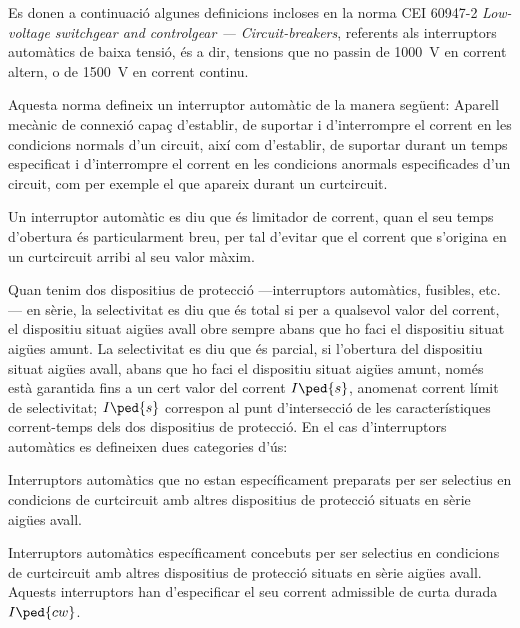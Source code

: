 Es donen a continuació algunes definicions incloses en la norma CEI 60947-2 \textit{Low-voltage switchgear and controlgear --- Circuit-breakers}, referents als interruptors automàtics de baixa tensió, és a dir, tensions que no passin de \qty{1000}{V} en corrent altern, o de \qty{1500}{V} en corrent continu.

Aquesta norma defineix un interruptor automàtic de la manera següent: Aparell mecànic de connexió capaç d'establir, de suportar i d'interrompre el corrent en les condicions normals d'un circuit, així com d'establir, de suportar durant un temps especificat i  d'interrompre el corrent en les condicions anormals especificades d'un circuit, com per exemple el que apareix durant un curtcircuit.

Un interruptor automàtic es diu que és limitador de corrent, quan el seu temps d'obertura és particularment breu, per tal d'evitar que el corrent que s'origina en un curtcircuit arribi al seu valor màxim.

Quan tenim dos  dispositius de protecció ---interruptors automàtics, fusibles, etc.--- en sèrie, la selectivitat es diu que és total si per a qualsevol valor del corrent, el dispositiu situat aigües avall obre sempre abans que ho faci el dispositiu situat aigües amunt. La selectivitat es diu que és parcial, si l'obertura del dispositiu situat aigües avall, abans que ho faci el dispositiu situat aigües amunt, només està garantida fins a un cert valor del corrent $I\ped{s}$, anomenat corrent límit de selectivitat; $I\ped{s}$ correspon al punt d'intersecció de les característiques corrent-temps dels dos dispositius de protecció. En el cas d'interruptors automàtics es defineixen dues categories d'ús:
\begin{list}{}
	{\setlength{\labelwidth}{10mm} \setlength{\leftmargin}{15mm} \setlength{\labelsep}{5mm}}
	\item[A] Interruptors automàtics que no estan específicament preparats per ser selectius en condicions de curtcircuit amb altres dispositius de protecció situats en sèrie  aigües avall.
	\item[B] Interruptors automàtics específicament concebuts per ser selectius en condicions de curtcircuit amb altres dispositius de protecció situats en sèrie  aigües avall. Aquests interruptors han d'especificar el seu corrent admissible de curta durada $I\ped{cw}$.
\end{list}

